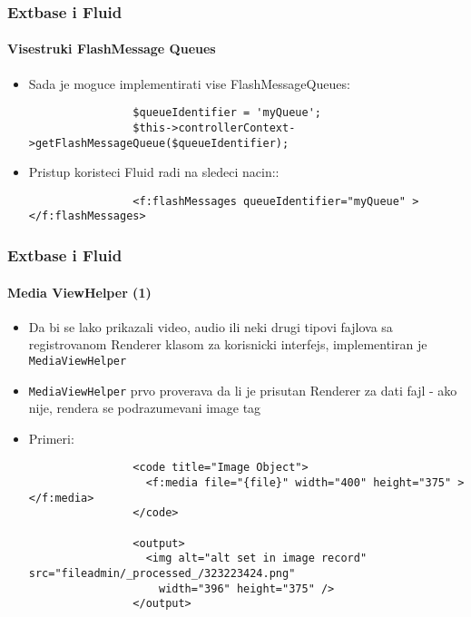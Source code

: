 \begin{frame}[fragile]
	\frametitle{Extbase i Fluid}
	\framesubtitle{Visestruki FlashMessage Queues}

	\begin{itemize}

		\item Sada je moguce implementirati vise FlashMessageQueues:

			\begin{lstlisting}
				$queueIdentifier = 'myQueue';
				$this->controllerContext->getFlashMessageQueue($queueIdentifier);
			\end{lstlisting}

		\item Pristup koristeci Fluid radi na sledeci nacin::

			\begin{lstlisting}
				<f:flashMessages queueIdentifier="myQueue" ></f:flashMessages>
			\end{lstlisting}

	\end{itemize}

\end{frame}


\begin{frame}[fragile]
	\frametitle{Extbase i Fluid}
	\framesubtitle{Media ViewHelper (1)}

	\lstset{basicstyle=\tiny\ttfamily}

	\begin{itemize}

		\item Da bi se lako prikazali video, audio ili neki drugi tipovi fajlova sa registrovanom
			Renderer klasom za korisnicki interfejs, implementiran je \texttt{MediaViewHelper}

		\item \texttt{MediaViewHelper} prvo proverava da li je prisutan Renderer za dati fajl - 
			ako nije, rendera se podrazumevani image tag

		\item Primeri:

			\begin{lstlisting}
				<code title="Image Object">
				  <f:media file="{file}" width="400" height="375" ></f:media>
				</code>

				<output>
				  <img alt="alt set in image record" src="fileadmin/_processed_/323223424.png"
				    width="396" height="375" />
				</output>
			\end{lstlisting}

	\end{itemize}

\end{frame}

